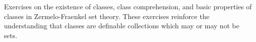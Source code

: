 Exercises on the existence of classes, class comprehension, and basic properties of classes in Zermelo-Fraenkel set theory. These exercises reinforce the understanding that classes are definable collections which may or may not be sets.
